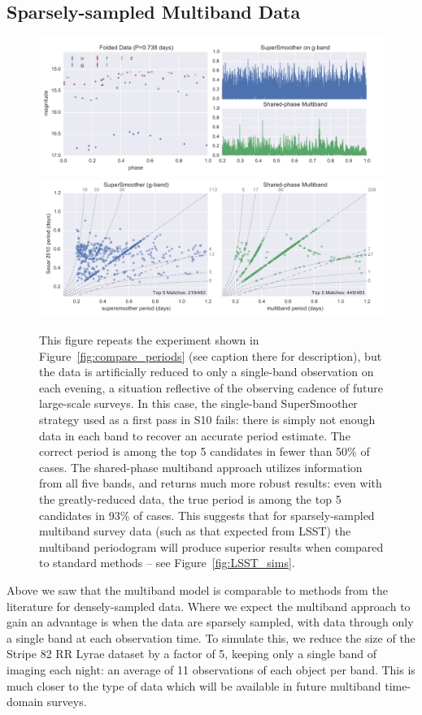 \documentclass{emulateapj}
\newcommand{\Fig}[1]{Figure~\ref{fig:#1}}
\newcommand{\fig}[1]{\Fig{#1}}
\newcommand{\figlabel}[1]{\label{fig:#1}}
\newcommand{\new}[1]{{\color{red} #1}}
\begin{document}
\subsection{Sparsely-sampled Multiband Data}

\begin{figure}
  \centering
  \includegraphics[width=\textwidth]{fig08a.pdf}
  \includegraphics[width=\textwidth]{fig08b.pdf}
  \caption{
    This figure repeats the experiment shown in \fig{compare_periods} (see caption there for description), but the data is artificially reduced to only a single-band observation on each evening, a situation reflective of the observing cadence of future large-scale surveys.
    In this case, the single-band SuperSmoother strategy used as a first pass in S10 fails: there is simply not enough data in each band to recover an accurate period estimate. The correct period is among the top 5 candidates in fewer than 50\% of cases.
    The shared-phase multiband approach utilizes information from all five bands, and returns much more robust results: even with the greatly-reduced data, the true period is among the top 5 candidates in 93\% of cases.
    \new{This suggests that for sparsely-sampled multiband survey data (such as that expected from LSST) the multiband periodogram will produce superior results when compared to standard methods -- see \fig{LSST_sims}.}
  } 
  \figlabel{compare_periods_reduced}
\end{figure}

Above we saw that the multiband model is comparable to methods from the literature for densely-sampled data. Where we expect the multiband approach to gain an advantage is when the data are sparsely sampled, with data through only a single band at each observation time. To simulate this, we reduce the size of the Stripe 82 RR Lyrae dataset by a factor of 5, keeping only a single band of imaging each night: an average of 11 observations of each object per band. This is much closer to the type of data which will be available in future multiband time-domain surveys.
\end{document}
